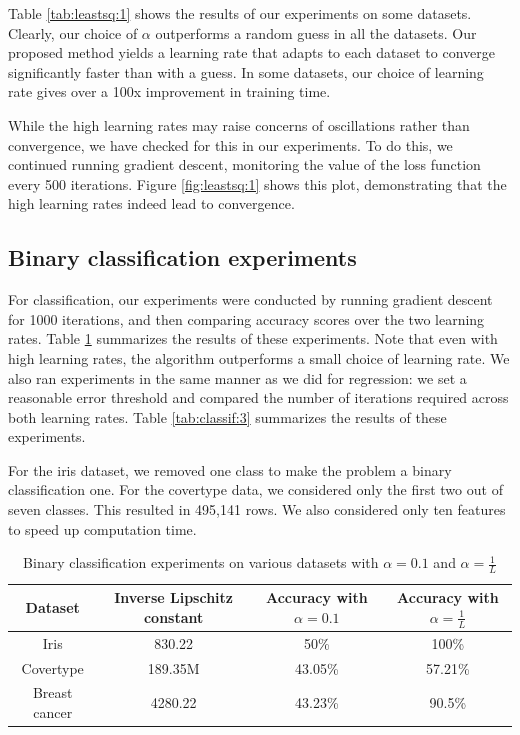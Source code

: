 \documentclass[sigconf,authordraft]{acmart}
\begin{document}
Table \ref{tab:leastsq:1} shows the results of our experiments on some datasets. Clearly, our choice of $\alpha$ outperforms a random guess in all the datasets. Our proposed method yields a learning rate that adapts to each dataset to converge significantly faster than with a guess. In some datasets, our choice of learning rate gives over a 100x improvement in training time.

While the high learning rates may raise concerns of oscillations rather than convergence, we have checked for this in our experiments. To do this, we continued running gradient descent, monitoring the value of the loss function every 500 iterations. Figure \ref{fig:leastsq:1} shows this plot, demonstrating that the high learning rates indeed lead to convergence.

\subsection{Binary classification experiments}
For classification, our experiments were conducted by running gradient descent for 1000 iterations, and then comparing accuracy scores over the two learning rates. Table \ref{tab:classif:1} summarizes the results of these experiments. Note that even with high learning rates, the algorithm outperforms a small choice of learning rate. We also ran experiments in the same manner as we did for regression: we set a reasonable error threshold and compared the number of iterations required across both learning rates. Table \ref{tab:classif:3} summarizes the results of these experiments.

For the iris dataset, we removed one class to make the problem a binary classification one. For the covertype data, we considered only the first two out of seven classes. This resulted in 495,141 rows. We also considered only ten features to speed up computation time.

\begin{table}
    \caption{Binary classification experiments on various datasets with $\alpha=0.1$ and $\alpha=\frac{1}{L}$}
    \centering
    \begin{tabular}{cccc}
        \toprule
        Dataset & Inverse Lipschitz constant & Accuracy with $\alpha=0.1$ & Accuracy with $\alpha=\frac{1}{L}$ \\
        \midrule
        Iris & 830.22 & 50\% & 100\% \\
        Covertype & 189.35M & 43.05\% & 57.21\% \\
        Breast cancer & 4280.22 & 43.23\% & 90.5\% \\
        \bottomrule
    \end{tabular}
    \label{tab:classif:1}
\end{table}
\end{document}
